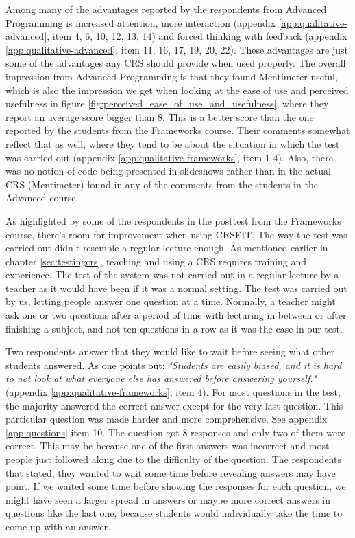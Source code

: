 Among many of the advantages reported by the respondents from Advanced Programming is increased attention, more interaction (appendix \ref{app:qualitative-advanced}, item 4, 6, 10, 12, 13, 14) and forced thinking with feedback (appendix \ref{app:qualitative-advanced}, item 11, 16, 17, 19, 20, 22). These advantages are just some of the advantages any CRS should provide when used properly. The overall impression from Advanced Programming is that they found Mentimeter useful, which is also the impression we get when looking at the ease of use and perceived usefulness in figure \ref{fig:perceived_ease_of_use_and_usefulness}, where they report an average score bigger than 8. This is a better score than the one reported by the students from the Frameworks course. Their comments somewhat reflect that as well, where they tend to be about the situation in which the test was carried out (appendix \ref{app:qualitative-frameworks}, item 1-4). Also, there was no notion of code being presented in slideshows rather than in the actual CRS (Mentimeter) found in any of the comments from the students in the Advanced course.

As highlighted by some of the respondents in the posttest from the Frameworks course, there's room for improvement when using CRSFIT. The way the test was carried out didn't resemble a regular lecture enough. As mentioned earlier in chapter \ref{sec:testingcrs}, teaching and using a CRS requires training and experience. The test of the system was not carried out in a regular lecture by a teacher as it would have been if it was a normal setting. The test was carried out by us, letting people answer one question at a time. Normally, a teacher might ask one or two questions after a period of time with lecturing in between or after finishing a subject, and not ten questions in a row as it was the case in our test.

Two respondents answer that they would like to wait before seeing what other students answered. As one points out: \emph{"Students are easily biased, and it is hard to not look at what everyone else has answered before answering yourself."} (appendix \ref{app:qualitative-frameworks}, item 4). For most questions in the test, the majority answered the correct answer except for the very last question. This particular question was made harder and more comprehensive. See appendix \ref{app:questions} item 10. The question got 8 responses and only two of them were correct. This may be because one of the first answers was incorrect and most people just followed along due to the difficulty of the question. The respondents that stated, they wanted to wait some time before revealing answers may have point. If we waited some time before showing the responses for each question, we might have seen a larger spread in answers or maybe more correct answers in questions like the last one, because students would individually take the time to come up with an answer. 

